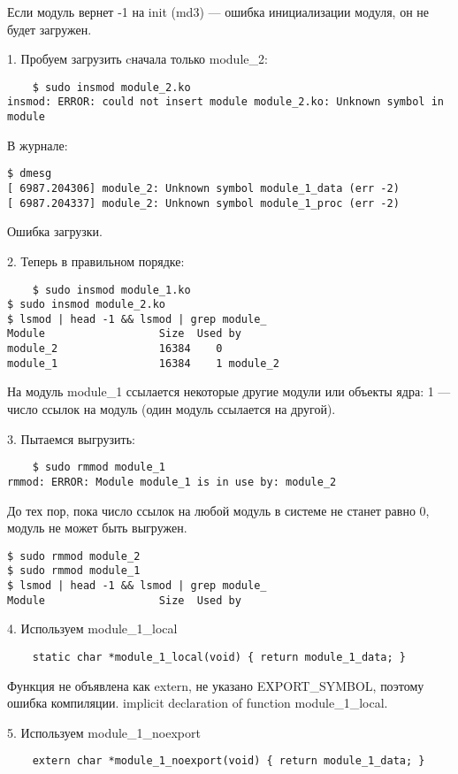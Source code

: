 Если модуль вернет -1 на init (md3) --- ошибка инициализации модуля, он не будет загружен.

1. Пробуем загрузить cначала только module\_2:
\begin{lstlisting}
    $ sudo insmod module_2.ko
insmod: ERROR: could not insert module module_2.ko: Unknown symbol in module
\end{lstlisting}

В журнале:
\begin{lstlisting}
$ dmesg
[ 6987.204306] module_2: Unknown symbol module_1_data (err -2)
[ 6987.204337] module_2: Unknown symbol module_1_proc (err -2)
\end{lstlisting}

Ошибка загрузки.

2. Теперь в правильном порядке:

\begin{lstlisting}
    $ sudo insmod module_1.ko
$ sudo insmod module_2.ko
$ lsmod | head -1 && lsmod | grep module_
Module                  Size  Used by
module_2                16384    0
module_1                16384    1 module_2
\end{lstlisting}

На модуль module\_1 ссылается некоторые другие модули или объекты ядра: 1 — число ссылок на модуль (один модуль ссылается на другой).

3. Пытаемся выгрузить:
\begin{lstlisting}
    $ sudo rmmod module_1
rmmod: ERROR: Module module_1 is in use by: module_2
\end{lstlisting}
До тех пор, пока число ссылок на любой модуль в системе не станет равно 0, модуль не может быть выгружен.

\begin{lstlisting}
$ sudo rmmod module_2
$ sudo rmmod module_1
$ lsmod | head -1 && lsmod | grep module_
Module                  Size  Used by
\end{lstlisting}

4. Используем module\_1\_local
\begin{lstlisting}
	static char *module_1_local(void) { return module_1_data; }
\end{lstlisting}

Функция не объявлена как extern, не указано EXPORT\_SYMBOL, поэтому ошибка компиляции. implicit declaration of function module\_1\_local.

5. Используем module\_1\_noexport
\begin{lstlisting}
	extern char *module_1_noexport(void) { return module_1_data; }
\end{lstlisting}


